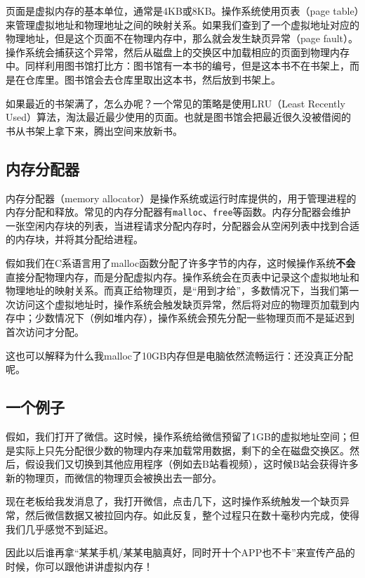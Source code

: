 页面是虚拟内存的基本单位，通常是4KB或8KB。操作系统使用页表（page table）来管理虚拟地址和物理地址之间的映射关系。如果我们查到了一个虚拟地址对应的物理地址，但是这个页面不在物理内存中，那么就会发生缺页异常（page fault）。操作系统会捕获这个异常，然后从磁盘上的交换区中加载相应的页面到物理内存中。同样利用图书馆打比方：图书馆有一本书的编号，但是这本书不在书架上，而是在仓库里。图书馆会去仓库里取出这本书，然后放到书架上。

如果最近的书架满了，怎么办呢？一个常见的策略是使用LRU（Least Recently Used）算法，淘汰最近最少使用的页面。也就是图书馆会把最近很久没被借阅的书从书架上拿下来，腾出空间来放新书。

\subsection{内存分配器}

内存分配器（memory allocator）是操作系统或运行时库提供的，用于管理进程的内存分配和释放。常见的内存分配器有\texttt{malloc}、\texttt{free}等函数。内存分配器会维护一张空闲内存块的列表，当进程请求分配内存时，分配器会从空闲列表中找到合适的内存块，并将其分配给进程。

假如我们在C系语言用了malloc函数分配了许多字节的内存，这时候操作系统\textbf{不会}直接分配物理内存，而是分配虚拟内存。操作系统会在页表中记录这个虚拟地址和物理地址的映射关系。而真正给物理页，是“用到才给”，多数情况下，当我们第一次访问这个虚拟地址时，操作系统会触发缺页异常，然后将对应的物理页加载到内存中；少数情况下（例如堆内存），操作系统会预先分配一些物理页而不是延迟到首次访问才分配。

这也可以解释为什么我malloc了10GB内存但是电脑依然流畅运行：还没真正分配呢。

\subsection{一个例子}

假如，我们打开了微信。这时候，操作系统给微信预留了1GB的虚拟地址空间；但是实际上只先分配很少数的物理内存来加载常用数据，剩下的全在磁盘交换区。然后，假设我们又切换到其他应用程序（例如去B站看视频），这时候B站会获得许多新的物理页，而微信的物理页会被换出去一部分。

现在老板给我发消息了，我打开微信，点击几下，这时操作系统触发一个缺页异常，然后微信数据又被拉回内存。如此反复，整个过程只在数十毫秒内完成，使得我们几乎感觉不到延迟。

因此以后谁再拿“某某手机/某某电脑真好，同时开十个APP也不卡”来宣传产品的时候，你可以跟他讲讲虚拟内存！

